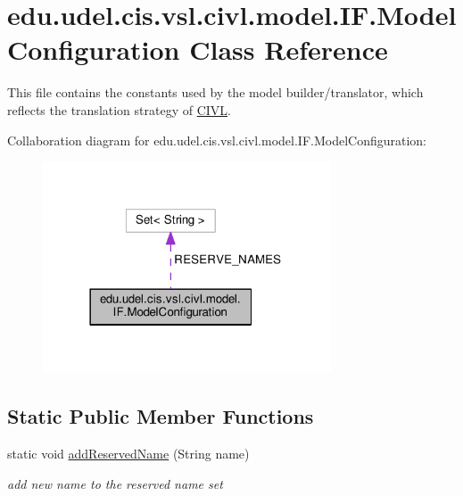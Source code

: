 \hypertarget{classedu_1_1udel_1_1cis_1_1vsl_1_1civl_1_1model_1_1IF_1_1ModelConfiguration}{}\section{edu.\+udel.\+cis.\+vsl.\+civl.\+model.\+I\+F.\+Model\+Configuration Class Reference}
\label{classedu_1_1udel_1_1cis_1_1vsl_1_1civl_1_1model_1_1IF_1_1ModelConfiguration}


This file contains the constants used by the model builder/translator, which reflects the translation strategy of \hyperlink{classedu_1_1udel_1_1cis_1_1vsl_1_1civl_1_1CIVL}{C\+I\+V\+L}.  




Collaboration diagram for edu.\+udel.\+cis.\+vsl.\+civl.\+model.\+I\+F.\+Model\+Configuration\+:
\nopagebreak
\begin{figure}[H]
\begin{center}
\leavevmode
\includegraphics[width=242pt]{classedu_1_1udel_1_1cis_1_1vsl_1_1civl_1_1model_1_1IF_1_1ModelConfiguration__coll__graph}
\end{center}
\end{figure}
\subsection*{Static Public Member Functions}
\begin{DoxyCompactItemize}
\item 
static void \hyperlink{classedu_1_1udel_1_1cis_1_1vsl_1_1civl_1_1model_1_1IF_1_1ModelConfiguration_a5f65fb93056abf7ad79789dd4666da15}{add\+Reserved\+Name} (String name)
\begin{DoxyCompactList}\small\item\em add new name to the reserved name set \end{DoxyCompactList}\end{DoxyCompactItemize}
